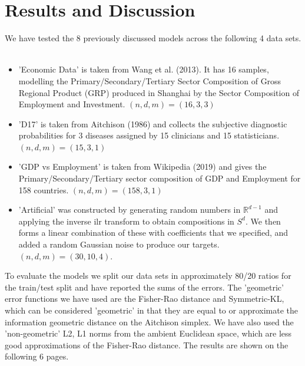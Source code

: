 \documentclass[BSc]{usydthesis}
\numberwithin{equation}{chapter}
\theoremstyle{remark}
\begin{document}
\chapter{Results and Discussion}
We have tested the 8 previously discussed models across the following 4 data sets. \\
\\
\begin{itemize}
 \item 'Economic Data' is taken from Wang et al. (2013). It has 16 samples, modelling the Primary/Secondary/Tertiary Sector Composition of Gross Regional Product (GRP) produced in Shanghai by the Sector Composition of Employment and Investment. $(n,d,m) = (16,3,3)$ \\
 \item 'D17' is taken from Aitchison (1986) and collects the subjective diagnostic probabilities for 3 diseases assigned by 15 clinicians and 15 statisticians. $(n,d,m) = (15,3,1)$\\
 \item 'GDP vs Employment' is taken from Wikipedia (2019) and gives the Primary/Secondary/Tertiary sector composition of GDP and Employment for 158 countries. $(n,d,m) = (158,3,1)$ \\
 \item 'Artificial' was constructed by generating random numbers in $\mathbb{R}^{d-1}$ and applying the inverse ilr transform to obtain compositions in $S^d.$ We then forms a linear combination of these with coefficients that we specified, and added a random Gaussian noise to  produce our targets. $(n,d,m) = (30,10,4).$\\
\end{itemize}

To evaluate the models we split our data sets in approximately 80/20 ratios for the train/test split and have reported the sums of the errors. The 'geometric' error functions we have used are the Fisher-Rao distance and Symmetric-KL, which can be considered 'geometric' in that they are equal to or approximate the information geometric distance on the Aitchison simplex. We have also used the 'non-geometric' L2, L1 norms from the ambient Euclidean space, which are less good approximations of the Fisher-Rao distance. The results are shown on the following 6 pages.\\

\newpage
\
\end{document}
